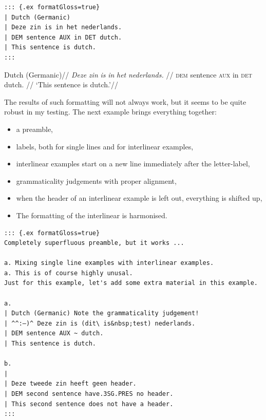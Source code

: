 \documentclass[
]{article}
\providecommand{\tightlist}{%
  \setlength{\itemsep}{0pt}\setlength{\parskip}{0pt}}
\begin{document}
\begin{verbatim}
::: {.ex formatGloss=true}
| Dutch (Germanic)
| Deze zin is in het nederlands.
| DEM sentence AUX in DET dutch.
| This sentence is dutch.
:::
\end{verbatim}

\begin{samepage}
  \begingl
  \glpreamble Dutch (Germanic)//
  \gla \emph{Deze} \emph{zin} \emph{is} \emph{in} \emph{het}
\emph{nederlands.} //
  \glb \textsc{dem} sentence \textsc{aux} in \textsc{det} dutch. //
  \glft `This sentence is dutch.'//
  \endgl
\xe
\end{samepage}

The results of such formatting will not always work, but it seems to be
quite robust in my testing. The next example brings everything together:

\begin{itemize}
\tightlist
\item
  a preamble,
\item
  labels, both for single lines and for interlinear examples,
\item
  interlinear examples start on a new line immediately after the
  letter-label,
\item
  grammaticality judgements with proper alignment,
\item
  when the header of an interlinear example is left out, everything is
  shifted up,
\item
  The formatting of the interlinear is harmonised.
\end{itemize}

\begin{verbatim}
::: {.ex formatGloss=true}
Completely superfluous preamble, but it works ...

a. Mixing single line examples with interlinear examples.
a. This is of course highly unusal.
Just for this example, let's add some extra material in this example.

a.
| Dutch (Germanic) Note the grammaticality judgement!
| ^^:–)^ Deze zin is (dit\ is&nbsp;test) nederlands.
| DEM sentence AUX ~ dutch.
| This sentence is dutch.

b.
|
| Deze tweede zin heeft geen header.
| DEM second sentence have.3SG.PRES no header.
| This second sentence does not have a header.
:::
\end{verbatim}
\end{document}
